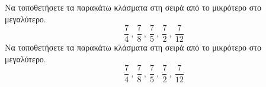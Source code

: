 Να τοποθετήσετε τα παρακάτω κλάσματα στη σειρά από το μικρότερο στο μεγαλύτερο.
\[ \frac{7}{4}\ ,\ \frac{7}{8}\ ,\ \frac{7}{5}\ ,\ \frac{7}{2}\ ,\ \dfrac{7}{12} \]
Να τοποθετήσετε τα παρακάτω κλάσματα στη σειρά από το μικρότερο στο μεγαλύτερο.
\[ \frac{7}{4}\ ,\ \frac{7}{8}\ ,\ \frac{7}{5}\ ,\ \frac{7}{2}\ ,\ \dfrac{7}{12} \]

